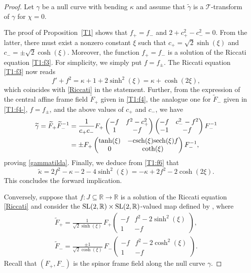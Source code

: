\documentclass[10pt,a4paper]{amsart}
\numberwithin{equation}{section}
\def\bending{\kappa}
\def\R{\mathbb{R}}
\def\SL{{\rm SL}(2,\R)}
\def\sech{{\rm sech}}
\def\csch{{\rm csch}}
\begin{document}
\begin{proof} Let $\gamma$ be a null curve with bending $\bending$ and assume that $\widetilde{\gamma}$ is a $\mathcal{T}$-transform of $\gamma$ for $\chi=0$.
	
	The proof of Proposition~\ref{T1} shows that $f_+=f_-$ and $2+c_+^2-c_-^2=0$. From the latter, there must exist a nonzero constant $\xi$ such that $c_+=\sqrt{2}\sinh(\xi)$ and $c_-=\pm\sqrt{2}\cosh(\xi)$. Moreover, the function $f_+=f_-$ is a solution of the Riccati equation \eqref{T1:f3}. For simplicity, we simply put $f=f_\pm$. The Riccati equation \eqref{T1:f3} now reads
	\begin{equation*}f'+f^2=\bending+1+2\sinh^2(\xi)=\bending+\cosh(2\xi),\end{equation*}
	which coincides with \eqref{Riccati} in the statement. Further, from the expression of the central affine frame field $\widetilde{F}_+$ given in \eqref{T1:f4}, the analogue one for $\widetilde{F}_-$ given in \eqref{T1:f4-}, $f=f_\pm$, and the above values of $c_+$ and $c_-$, we have
	\begin{align*}
		\widetilde{\gamma}=\widetilde{F}_+\widetilde{F}_-^{-1}&{}=\frac{1}{c_+c_-}F_+\begin{pmatrix} -f & f^2-c_+^2 \\ 1 & -f \end{pmatrix}\begin{pmatrix} -f & c_-^2-f^2 \\ -1 & -f\end{pmatrix}F_-^{-1}\\
		&{}=\pm F_+\begin{pmatrix} \tanh(\xi) & -\csch(\xi)\sech(\xi)f \\ 0 & \coth(\xi)\end{pmatrix}F_-^{-1},
	\end{align*}
	proving \eqref{gammatilda}. Finally, we deduce from \eqref{T1:f6} that
	\begin{equation*}\widetilde{\bending}=2f^2-\bending-2-4\sinh^2(\xi)=-\bending+2f^2-2\cosh(2\xi).\end{equation*}
	This concludes the forward implication.
	
	Conversely, suppose that $f\colon J\subseteq\R\longrightarrow\R$ is a solution of the Riccati equation \eqref{Riccati} and consider the $\SL\times\SL$-valued map defined by , where
	\begin{gather}
		\widetilde{F}_+=\frac{1}{\sqrt{2} \sinh(\xi)}\,F_+\begin{pmatrix} -f & f^2-2\sinh^2(\xi) \\ 1 & -f\end{pmatrix},\label{tildeF+}\\
		\widetilde{F}_-=\frac{\pm 1}{\sqrt{2} \cosh(\xi)}\,F_-\begin{pmatrix} -f & f^2-2\cosh^2(\xi) \\ 1 & -f \end{pmatrix}.\label{tildeF-}
	\end{gather}
	Recall that $(F_+,F_-)$ is the spinor frame field along the null curve $\gamma$.
	

\end{proof}
\end{document}
